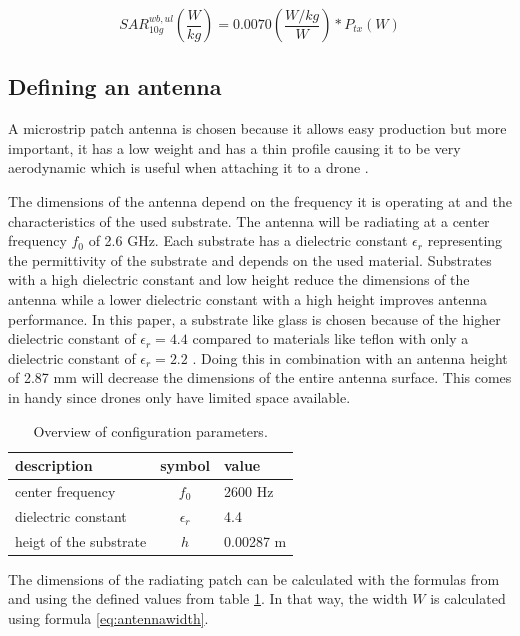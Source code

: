 \begin{equation} 
SAR^{wb,ul}_{10g} \left(\frac{W}{kg}\right) = 0.0070 \left(\frac{W/kg}{W}\right) * P_{tx} (W)
\label{eq:ulToSar}
\end{equation}

\subsection{Defining an antenna}
\label{sub:definingAntenna}
A microstrip patch antenna is chosen because it allows easy production but more important, it has a low weight 
and has a thin profile causing it to be very aerodynamic which is useful when attaching it to a drone \cite{J13_microstripadvantages}.

The dimensions of the antenna depend on the frequency it is operating at and the characteristics of the used substrate.
The antenna will be radiating at a center frequency $f_0$ of 2.6 GHz. Each substrate has a dielectric constant $\epsilon_r$ representing 
the permittivity of the substrate and depends on the used material.
Substrates with a high dielectric constant and low height 
reduce the dimensions of the antenna
while a lower dielectric constant with a high height improves antenna performance. 
In this paper, a substrate like glass 
is chosen because of the higher dielectric constant of $\epsilon_r = 4.4$ compared to materials like teflon with only a dielectric 
constant of $\epsilon_r = 2.2$ \cite{J14_antennadesign}. 
Doing this in combination with an antenna height of 2.87 mm will decrease the dimensions of the entire antenna surface.
This comes in handy since drones only have limited space available.

\begin{table}[h!]
\centering
\begin{tabular}{|l|c|l|}
\hline
 description            & symbol          & value         \\    \hline
 center frequency       & $f_0$           & 2600 Hz       \\ 
 dielectric constant    & $\epsilon_r$    & 4.4         \\ 
 heigt of the substrate & $h$             & 0.00287 m    \\ \hline
\end{tabular}
\caption{Overview of configuration parameters.}
\label{table:antennaparas}
\end{table}

The dimensions of the radiating patch can be calculated with the formulas from \cite{J14_antennadesign} and \cite{J15_antennadesign}
using the defined values from table \ref{table:antennaparas}. In that way, the width $W$ is calculated using formula \ref{eq:antennawidth}.

